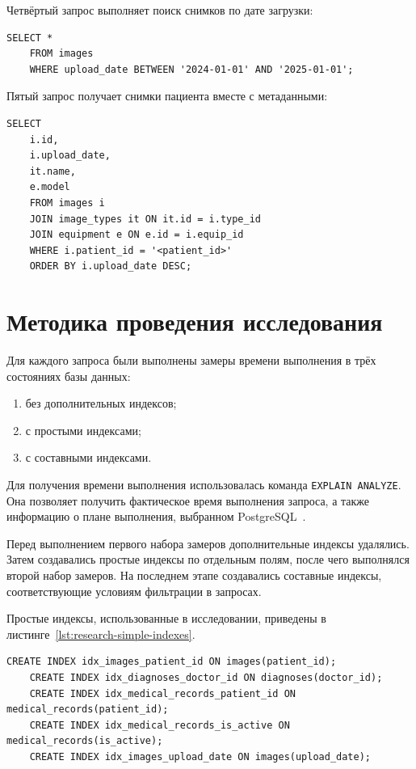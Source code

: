 Четвёртый запрос выполняет поиск снимков по дате загрузки:

\begin{lstlisting}[caption={Получение снимков за период времени}]
	SELECT *
	FROM images
	WHERE upload_date BETWEEN '2024-01-01' AND '2025-01-01';
\end{lstlisting}

Пятый запрос получает снимки пациента вместе с метаданными:

\begin{lstlisting}[caption={Получение снимков пациента с метаданными}]
	SELECT
	i.id,
	i.upload_date,
	it.name,
	e.model
	FROM images i
	JOIN image_types it ON it.id = i.type_id
	JOIN equipment e ON e.id = i.equip_id
	WHERE i.patient_id = '<patient_id>'
	ORDER BY i.upload_date DESC;
\end{lstlisting}

\section{Методика проведения исследования}

Для каждого запроса были выполнены замеры времени выполнения в трёх состояниях базы данных:

\begin{enumerate}
	\item без дополнительных индексов;
	\item с простыми индексами;
	\item с составными индексами.
\end{enumerate}

Для получения времени выполнения использовалась команда \texttt{EXPLAIN ANALYZE}. Она позволяет получить фактическое время выполнения запроса, а также информацию о плане выполнения, выбранном PostgreSQL~\cite{postgresql-docs}.

Перед выполнением первого набора замеров дополнительные индексы удалялись. Затем создавались простые индексы по отдельным полям, после чего выполнялся второй набор замеров. На последнем этапе создавались составные индексы, соответствующие условиям фильтрации в запросах.

Простые индексы, использованные в исследовании, приведены в листинге~\ref{lst:research-simple-indexes}.

\begin{lstlisting}[caption={Простые индексы}, label={lst:research-simple-indexes}]
	CREATE INDEX idx_images_patient_id ON images(patient_id);
	CREATE INDEX idx_diagnoses_doctor_id ON diagnoses(doctor_id);
	CREATE INDEX idx_medical_records_patient_id ON medical_records(patient_id);
	CREATE INDEX idx_medical_records_is_active ON medical_records(is_active);
	CREATE INDEX idx_images_upload_date ON images(upload_date);
\end{lstlisting}

